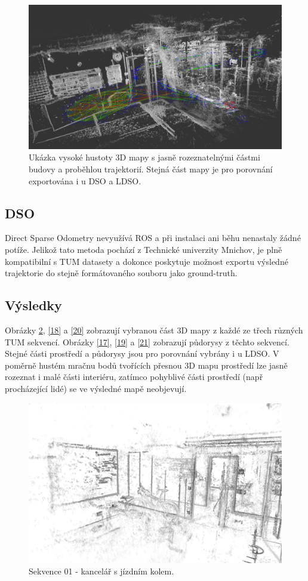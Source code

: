\documentclass[12pt,a4paper]{report}
\begin{document}
\begin{figure}[H]
\centering
\includegraphics[scale=0.31]{img/LSD_11_kancl.png}
\caption{Ukázka vysoké hustoty 3D mapy s jasně rozeznatelnými částmi budovy a proběhlou trajektorií. Stejná část mapy je pro porovnání exportována i u DSO a LDSO.}
\label{15}
\end{figure} 

\subsection{DSO}
Direct Sparse Odometry nevyužívá ROS a při instalaci ani běhu nenastaly žádné potíže. Jelikož tato metoda pochází z Technické univerzity Mnichov, je plně kompatibilní s TUM datasety a dokonce poskytuje možnost exportu výsledné trajektorie do stejně formáto\-vaného souboru jako ground-truth.

\subsection*{Výsledky}
Obrázky \ref{16}, \ref{18} a \ref{20} zobrazují vybranou část 3D mapy z každé ze třech různých TUM sekvencí. Obrázky \ref{17}, \ref{19} a \ref{21} zobrazují půdorysy z těchto sekvencí. Stejné části prostředí a půdorysy jsou pro porovnání vybrány i u LDSO. V poměrně hustém mračnu bodů tvořících přesnou 3D mapu prostředí lze jasně rozeznat i malé části interiéru, zatímco pohyblivé části prostředí (např procházející lidé) se ve výsledné mapě neobjevují.

\begin{figure}[H]
\centering
\includegraphics[width=1.0\textwidth]{img/DSO_01_kolo.png}
\caption{Sekvence 01 - kancelář s jízdním kolem.}
\label{16}
\end{figure} 
\end{document}
